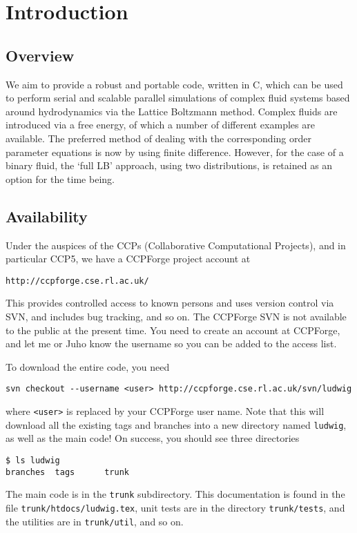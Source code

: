 \section{Introduction}

\subsection{Overview}

We aim to provide a robust and portable code, written in C, which
can be used to perform serial and scalable parallel simulations of
complex fluid systems based around hydrodynamics via the Lattice
Boltzmann method. Complex fluids are introduced via a free energy,
of which a number of different examples are available. The preferred
method of dealing with the corresponding order parameter equations
is now by using finite difference. However, for the case of a binary
fluid, the `full LB' approach, using two distributions, is retained
as an option for the time being.

\subsection{Availability}

Under the auspices of the CCPs (Collaborative Computational Projects),
and in particular CCP5, we have a CCPForge project account at

\texttt{http://ccpforge.cse.rl.ac.uk/}

This provides controlled access to known persons and uses version
control via SVN, and includes bug
tracking, and so on. The CCPForge SVN is not available to the public
at the present time. You need to create an account at CCPForge, and
let me or Juho know the username so you can be added to the access list.

To download the entire code, you need
\begin{verbatim}
svn checkout --username <user> http://ccpforge.cse.rl.ac.uk/svn/ludwig
\end{verbatim}
where \texttt{<user>} is replaced by your CCPForge user name.
Note that this will download all the existing tags and branches
into a new directory named \texttt{ludwig}, as well as the main code!
On success, you should see three directories
\begin{verbatim}
$ ls ludwig
branches  tags      trunk
\end{verbatim}
The main code is in the \texttt{trunk} subdirectory. This documentation is
found in the file \texttt{trunk/htdocs/ludwig.tex}, unit tests are in
the directory \texttt{trunk/tests}, and the utilities are in
\texttt{trunk/util}, and so on.


